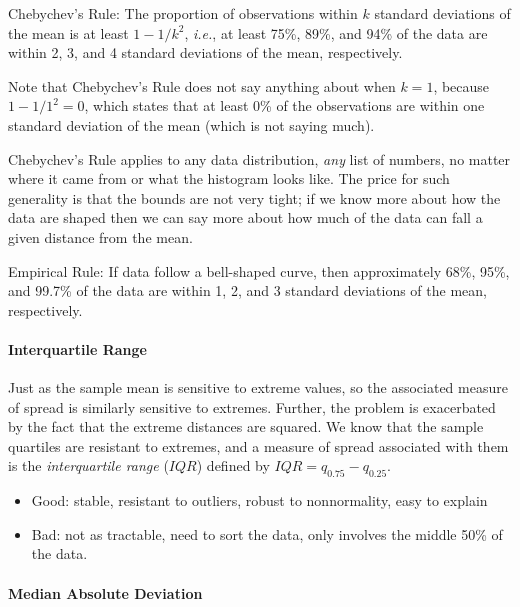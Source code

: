 \documentclass[captions=tableheading]{scrbook}
\begin{document}
\begin{fact}
Chebychev's Rule: The proportion of observations within \(k\) standard deviations of the mean is at least \(1-1/k^{2}\), \emph{i.e.}, at least 75\%, 89\%, and 94\% of the data are within 2, 3, and 4 standard deviations of the mean, respectively.
\end{fact}

Note that Chebychev's Rule does not say anything about when \(k=1\), because \(1-1/1^{2}=0\), which states that at least 0\% of the observations are within one standard deviation of the mean (which is not saying much).

Chebychev's Rule applies to any data distribution, \emph{any} list of numbers, no matter where it came from or what the histogram looks like. The price for such generality is that the bounds are not very tight; if we know more about how the data are shaped then we can say more about how much of the data can fall a given distance from the mean.

\begin{fact}
\label{fac:Empirical-Rule}Empirical Rule: If data follow a bell-shaped
curve, then approximately 68\%, 95\%, and 99.7\% of the data are within
1, 2, and 3 standard deviations of the mean, respectively. 
\end{fact}


\paragraph*{Interquartile Range}

Just as the sample mean is sensitive to extreme values, so the associated measure of spread is similarly sensitive to extremes. Further, the problem is exacerbated by the fact that the extreme distances are squared. We know that the sample quartiles are resistant to extremes, and a measure of spread associated with them is the \emph{interquartile range} (\(IQR\)) defined by \(IQR=q_{0.75}-q_{0.25}\).

\begin{itemize}
\item Good: stable, resistant to outliers, robust to nonnormality, easy to explain
\item Bad: not as tractable, need to sort the data, only involves the middle 50\% of the data.
\end{itemize}

\paragraph*{Median Absolute Deviation}
\end{document}
